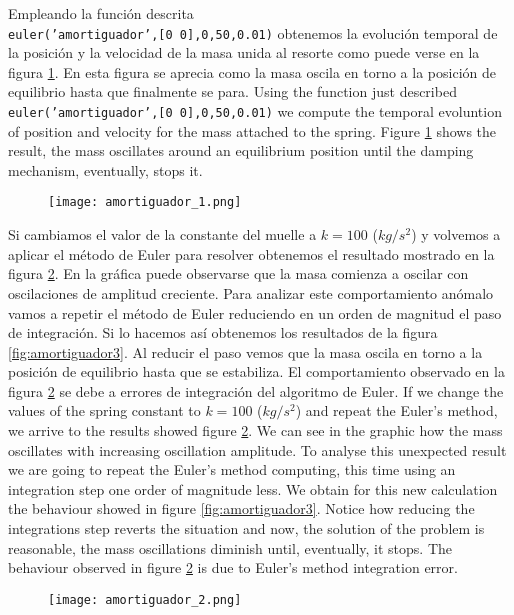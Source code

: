 \begin{paracol}{2}
Empleando la función descrita \\ \texttt{euler('amortiguador',[0 0],0,50,0.01)} obtenemos la evolución temporal de la posición y la velocidad de la masa unida al resorte como puede verse en la figura \ref{fig:amortiguador1}. En esta figura se aprecia como la masa oscila en torno a la posición de equilibrio hasta que finalmente se para.
\switchcolumn
Using the function just described \\ \texttt{euler('amortiguador',[0 0],0,50,0.01)} we compute the temporal evoluntion of position and velocity for the mass attached to the spring. Figure \ref{fig:amortiguador1} shows the result, the mass oscillates around an equilibrium position until the damping mechanism, eventually, stops it. 
\end{paracol}
\begin{figure}[h]
	\centering
	\texttt{[image: amortiguador\_1.png]}
	\label{fig:amortiguador1}
\end{figure}
\begin{paracol}{2}
Si cambiamos el valor de la constante del muelle a $k=100$ ($kg/s^2$) y volvemos a aplicar el método de Euler para resolver obtenemos el resultado mostrado en la figura \ref{fig:amortiguador2}. En la gráfica puede observarse que la masa comienza a oscilar con oscilaciones de amplitud creciente. Para analizar este comportamiento anómalo vamos a repetir el método de Euler reduciendo en un orden de magnitud el paso de integración. Si lo hacemos así obtenemos los resultados de la figura \ref{fig:amortiguador3}. Al reducir el paso vemos que la masa oscila en torno a la posición de equilibrio hasta que se estabiliza. El comportamiento observado en la figura \ref{fig:amortiguador2} se debe a errores de integración del algoritmo de Euler.
\switchcolumn
If we change the values of the spring constant to $k=100$ ($kg/s^2$) and repeat the Euler's method, we arrive to the results showed figure \ref{fig:amortiguador2}. We can see in the graphic how the mass oscillates with increasing oscillation amplitude. To analyse this unexpected result we are going to repeat the Euler's method computing, this time using an integration step one order of magnitude less. We obtain for this new calculation the behaviour showed in figure \ref{fig:amortiguador3}. Notice how reducing the integrations step reverts the situation and now, the solution of the problem is reasonable, the mass oscillations diminish until, eventually, it stops. The behaviour observed in figure \ref{fig:amortiguador2} is due to Euler's method integration error.   
\end{paracol}
\begin{figure}[h]
	\centering
	\texttt{[image: amortiguador\_2.png]}
	\label{fig:amortiguador2}
\end{figure}

